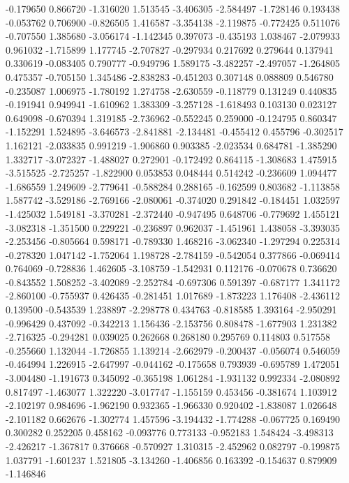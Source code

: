 -0.179650
0.866720
-1.316020
1.513545
-3.406305
-2.584497
-1.728146
0.193438
-0.053762
0.706900
-0.826505
1.416587
-3.354138
-2.119875
-0.772425
0.511076
-0.707550
1.385680
-3.056174
-1.142345
0.397073
-0.435193
1.038467
-2.079933
0.961032
-1.715899
1.177745
-2.707827
-0.297934
0.217692
0.279644
0.137941
0.330619
-0.083405
0.790777
-0.949796
1.589175
-3.482257
-2.497057
-1.264805
0.475357
-0.705150
1.345486
-2.838283
-0.451203
0.307148
0.088809
0.546780
-0.235087
1.006975
-1.780192
1.274758
-2.630559
-0.118779
0.131249
0.440835
-0.191941
0.949941
-1.610962
1.383309
-3.257128
-1.618493
0.103130
0.023127
0.649098
-0.670394
1.319185
-2.736962
-0.552245
0.259000
-0.124795
0.860347
-1.152291
1.524895
-3.646573
-2.841881
-2.134481
-0.455412
0.455796
-0.302517
1.162121
-2.033835
0.991219
-1.906860
0.903385
-2.023534
0.684781
-1.385290
1.332717
-3.072327
-1.488027
0.272901
-0.172492
0.864115
-1.308683
1.475915
-3.515525
-2.725257
-1.822900
0.053853
0.048444
0.514242
-0.236609
1.094477
-1.686559
1.249609
-2.779641
-0.588284
0.288165
-0.162599
0.803682
-1.113858
1.587742
-3.529186
-2.769166
-2.080061
-0.374020
0.291842
-0.184451
1.032597
-1.425032
1.549181
-3.370281
-2.372440
-0.947495
0.648706
-0.779692
1.455121
-3.082318
-1.351500
0.229221
-0.236897
0.962037
-1.451961
1.438058
-3.393035
-2.253456
-0.805664
0.598171
-0.789330
1.468216
-3.062340
-1.297294
0.225314
-0.278320
1.047142
-1.752064
1.198728
-2.784159
-0.542054
0.377866
-0.069414
0.764069
-0.728836
1.462605
-3.108759
-1.542931
0.112176
-0.070678
0.736620
-0.843552
1.508252
-3.402089
-2.252784
-0.697306
0.591397
-0.687177
1.341172
-2.860100
-0.755937
0.426435
-0.281451
1.017689
-1.873223
1.176408
-2.436112
0.139500
-0.543539
1.238897
-2.298778
0.434763
-0.818585
1.393164
-2.950291
-0.996429
0.437092
-0.342213
1.156436
-2.153756
0.808478
-1.677903
1.231382
-2.716325
-0.294281
0.039025
0.262668
0.268180
0.295769
0.114803
0.517558
-0.255660
1.132044
-1.726855
1.139214
-2.662979
-0.200437
-0.056074
0.546059
-0.464994
1.226915
-2.647997
-0.044162
-0.175658
0.793939
-0.695789
1.472051
-3.004480
-1.191673
0.345092
-0.365198
1.061284
-1.931132
0.992334
-2.080892
0.817497
-1.463077
1.322220
-3.017747
-1.155159
0.453456
-0.381674
1.103912
-2.102197
0.984696
-1.962190
0.932365
-1.966330
0.920402
-1.838087
1.026648
-2.101182
0.662676
-1.302774
1.457596
-3.194432
-1.774288
-0.067725
0.169490
0.300282
0.252205
0.458162
-0.093776
0.773133
-0.952183
1.548424
-3.498313
-2.426217
-1.367817
0.376668
-0.570927
1.310315
-2.452962
0.082797
-0.199875
1.037791
-1.601237
1.521805
-3.134260
-1.406856
0.163392
-0.154637
0.879909
-1.146846
